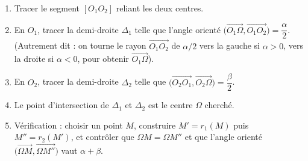 \documentclass[11pt]{article}
\begin{document}
\begin{methode}
\begin{enumerate}
\item Tracer le segment $[O_1O_2]$ reliant les deux centres.
\item En $O_1$, tracer la demi-droite $\Delta_1$ telle que l'angle orienté $\big(\overrightarrow{O_1\Omega}, \overrightarrow{O_1O_2}\big) = \dfrac{\alpha}{2}$. (Autrement dit : on tourne le rayon $\overrightarrow{O_1O_2}$ de $\alpha/2$ vers la gauche si $\alpha>0$, vers la droite si $\alpha<0$, pour obtenir $\overrightarrow{O_1\Omega}$).
\item En $O_2$, tracer la demi-droite $\Delta_2$ telle que $\big(\overrightarrow{O_2O_1}, \overrightarrow{O_2\Omega}\big) = \dfrac{\beta}{2}$.
\item Le point d'intersection de $\Delta_1$ et $\Delta_2$ est le centre $\Omega$ cherché.
\item Vérification : choisir un point $M$, construire $M' = r_1(M)$ puis $M'' = r_2(M')$, et contrôler que $\Omega M = \Omega M''$ et que l'angle orienté $\big(\overrightarrow{\Omega M}, \overrightarrow{\Omega M''}\big)$ vaut $\alpha + \beta$.
\end{enumerate}
\end{methode}
\end{document}
